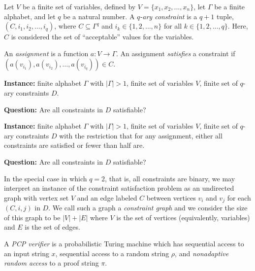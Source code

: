 \documentclass{article}
\begin{document}
\begin{definition}
  Let $V$ be a finite set of variables, defined by $V = \{x_1, x_2, \dotsc, x_n\}$, let $\Gamma$ be a finite alphabet, and let $q$ be a natural number.
  A \emph{$q$-ary constraint} is a $q + 1$ tuple, $(C, i_1, i_2, \dotsc, i_q)$, where $C \subseteq \Gamma^q$ and $i_k \in \{1, 2, \dotsc, n\}$ for all $k \in \{1, 2, \ldots, q\}$.
  Here, $C$ is considered the set of ``acceptable'' values for the variables.

  An \emph{assignment} is a function $a \colon V \to \Gamma$.
  An assignment \emph{satisfies} a constraint if $(a(v_{i_1}), a(v_{i_2}), \dotsc, a(v_{i_q})) \in C$.
\end{definition}

\begin{definition}
  \mbox{}

  \textbf{Instance:} finite alphabet $\Gamma$ with $|\Gamma| > 1$, finite set of variables $V$, finite set of $q$-ary constraints $D$.

  \textbf{Question:} Are all constraints in $D$ satisfiable?
\end{definition}

\begin{definition}
  \mbox{}

  \textbf{Instance:} finite alphabet $\Gamma$ with $|\Gamma| > 1$, finite set of variables $V$, finite set of $q$-ary constraints $D$ with the restriction that for any assignment, either all constraints are satisfied or fewer than half are.

  \textbf{Question:} Are all constraints in $D$ satisfiable?
\end{definition}

In the special case in which $q = 2$, that is, all constraints are binary, we may interpret an instance of the constraint satisfaction problem as an undirected graph with vertex set $V$ and an edge labeled $C$ between vertices $v_i$ and $v_j$ for each $(C, i, j)$ in $D$.
We call such a graph a \emph{constraint graph} and we consider the size of this graph to be $|V| + |E|$ where $V$ is the set of vertices (equivalently, variables) and $E$ is the set of edges.

\begin{definition}
  A \emph{PCP verifier} is a probabilistic Turing machine which has sequential access to an input string $x$, sequential access to a random string $\rho$, and \emph{nonadaptive random access} to a proof string $\pi$.
\end{definition}
\end{document}
